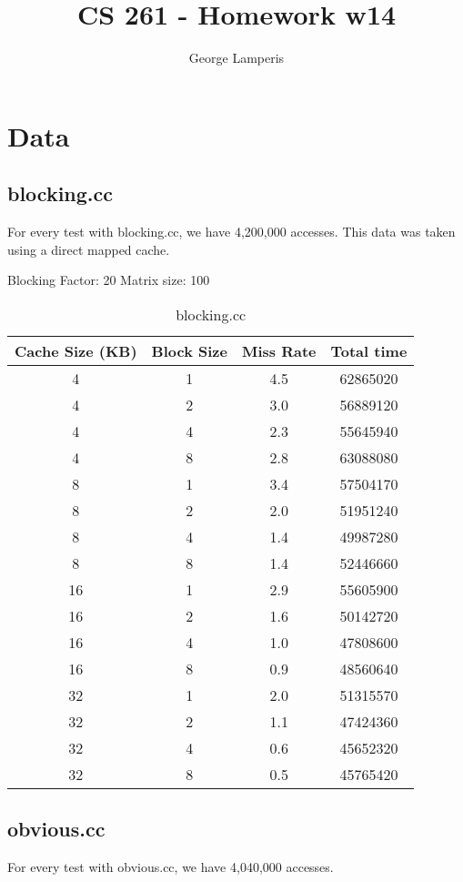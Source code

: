 \documentclass[letterpaper, 12pt, oneside]{memoir}
\title{CS 261 - Homework w14}
\author{George Lamperis}
\date{}
\begin{document}
\maketitle

\section{Data}

\subsection{blocking.cc}
For every test with blocking.cc, we have 4,200,000 accesses. This data 
was taken using a direct mapped cache.

Blocking Factor: 20
Matrix size: 100
\begin{table}[H]
\centering
\begin{tabular}{c|c|c|c}
    Cache Size (KB)  & Block Size & Miss Rate & Total time \\ \hline 
    4  & 1 & 4.5    & 62865020 \\
    4  & 2 & 3.0    & 56889120 \\
    4  & 4 & 2.3    & 55645940 \\
    4  & 8 & 2.8    & 63088080 \\ \hline
    8  & 1 & 3.4    & 57504170 \\
    8  & 2 & 2.0    & 51951240 \\
    8  & 4 & 1.4    & 49987280 \\
    8  & 8 & 1.4    & 52446660 \\ \hline
    16 & 1 & 2.9    & 55605900 \\
    16 & 2 & 1.6    & 50142720 \\
    16 & 4 & 1.0    & 47808600 \\
    16 & 8 & 0.9    & 48560640 \\ \hline
    32 & 1 & 2.0    & 51315570 \\
    32 & 2 & 1.1    & 47424360 \\
    32 & 4 & 0.6    & 45652320 \\
    32 & 8 & 0.5    & 45765420 \\
\end{tabular}
\caption{blocking.cc}
\end{table}

\subsection{obvious.cc}
For every test with obvious.cc, we have 4,040,000 accesses.
\end{document}
